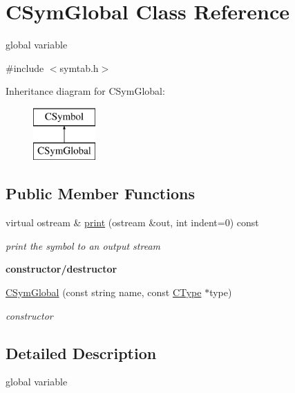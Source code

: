 \hypertarget{classCSymGlobal}{\section{C\-Sym\-Global Class Reference}
\label{classCSymGlobal}
}


global variable  




{\ttfamily \#include $<$symtab.\-h$>$}

Inheritance diagram for C\-Sym\-Global\-:\begin{figure}[H]
\begin{center}
\leavevmode
\includegraphics[height=2.000000cm]{classCSymGlobal}
\end{center}
\end{figure}
\subsection*{Public Member Functions}
\begin{DoxyCompactItemize}
\item 
virtual ostream \& \hyperlink{classCSymGlobal_a4a00583a9edb377b090572fc631e6764}{print} (ostream \&out, int indent=0) const 
\begin{DoxyCompactList}\small\item\em print the symbol to an output stream \end{DoxyCompactList}\end{DoxyCompactItemize}
\begin{Indent}{\bf constructor/destructor}\par
\begin{DoxyCompactItemize}
\item 
\hyperlink{classCSymGlobal_a98e1ff54cfc46b6ce1fd5692c9430a9a}{C\-Sym\-Global} (const string name, const \hyperlink{classCType}{C\-Type} $\ast$type)
\begin{DoxyCompactList}\small\item\em constructor \end{DoxyCompactList}\end{DoxyCompactItemize}
\end{Indent}


\subsection{Detailed Description}
global variable 

